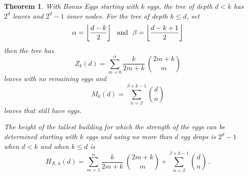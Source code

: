 \documentclass[12pt]{amsart}
\newtheorem{theorem}{Theorem}[section]
\theoremstyle{definition}
\theoremstyle{theorem}
\begin{document}
\begin{theorem}
With  Bonus Eggs starting with $k$ eggs, 
the tree of depth $d<k$ has $2^d$ leaves and $2^d-1$ inner nodes.
For the tree of depth $k\leq d$, set
$$
\alpha = \left\lfloor  \frac{d-k}{2}  \right\rfloor \hbox{\rm\ \ and\ \ } 
\beta =  \left\lfloor  \frac{d-k+1}{2}  \right\rfloor
$$ 
then the tree has
$$
Z_k(d) = \sum_{m=0}^\alpha  \frac{k}{2m+k}\ \binom{2m+k}{m}
$$
leaves with  no remaining eggs  and
$$
M_k(d) = \sum_{n= \beta}^{\beta+k-1} \binom{d}{n}
$$
leaves that still have eggs.

The height of the tallest building for which the strength of the 
eggs can be determined starting with $k$ eggs and  
using no more than $d$ egg drops
is  $2^d-1$ when $d<k$ and when $k\leq d$ is 
$$
H_{{\mathcal B},\,k}(d) =
\sum_{m=1}^\alpha   \frac{k}{2m+k}\ \binom{2m+k}{m}
+ 
\sum_{n= \beta}^{\beta + k -1} \binom{d}{n}
\,.
$$
\end{theorem}
\end{document}
